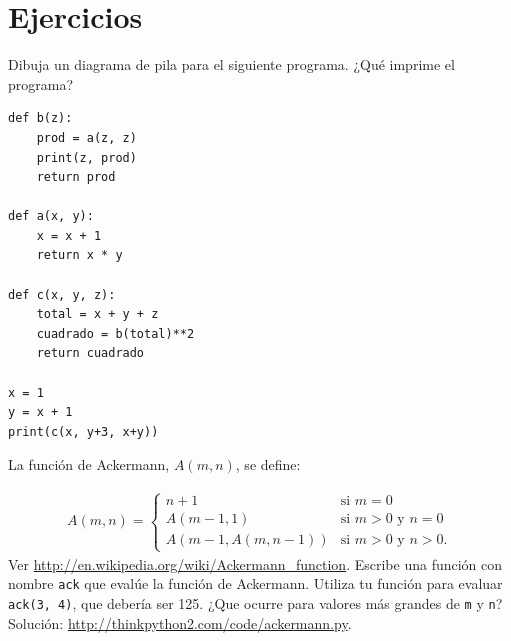 \documentclass[10pt]{book}
\begin{document}
\section{Ejercicios}

\begin{exercise}

Dibuja un diagrama de pila para el siguiente programa.  ¿Qué imprime el programa?

\begin{verbatim}
def b(z):
    prod = a(z, z)
    print(z, prod)
    return prod

def a(x, y):
    x = x + 1
    return x * y

def c(x, y, z):
    total = x + y + z
    cuadrado = b(total)**2
    return cuadrado

x = 1
y = x + 1
print(c(x, y+3, x+y))
\end{verbatim}

\end{exercise}


\begin{exercise}
\label{ackermann}

La función de Ackermann, $A(m, n)$, se define:

\begin{eqnarray*}
A(m, n) = \begin{cases}
              n+1 & \mbox{si } m = 0 \\
        A(m-1, 1) & \mbox{si } m > 0 \mbox{ y } n = 0 \\
A(m-1, A(m, n-1)) & \mbox{si } m > 0 \mbox{ y } n > 0.
\end{cases}
\end{eqnarray*}
%
Ver \url{http://en.wikipedia.org/wiki/Ackermann_function}.
Escribe una función con nombre {\tt ack} que evalúe la función de Ackermann.
Utiliza tu función para evaluar {\tt ack(3, 4)}, que debería ser 125.
¿Que ocurre para valores más grandes de {\tt m} y {\tt n}?
Solución: \url{http://thinkpython2.com/code/ackermann.py}.

\end{exercise}
\end{document}
